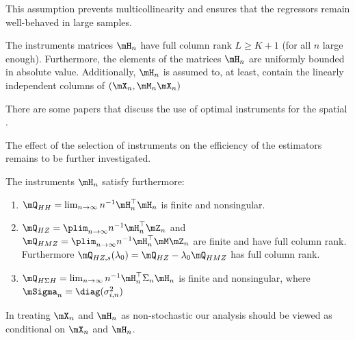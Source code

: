 \documentclass[english,12pt]{book}\usepackage[]{graphicx}\usepackage[]{xcolor}
\begin{document}
This assumption prevents multicollinearity and ensures that the regressors remain well-behaved in large samples.

\begin{assumption} The instruments matrices $\mH_n$ have full column rank $L \geq K + 1$ (for all $n$ large enough). Furthermore, the elements of the matrices $\mH_n$ are uniformly bounded in absolute value. Additionally, $\mH_n$ is assumed to, at least, contain the linearly independent columns of $(\mX_n, \mM_n\mX_n)$
\end{assumption}

There are some papers that discuss the use of optimal instruments for the spatial \citep[see for example][]{lee2003best, das2003finite, Keliejian2004, lee2007gmm}.

\begin{remark}
The effect of the selection of instruments on the efficiency of the estimators remains to be further investigated.
\end{remark}

\begin{assumption}\label{assumption:instruments-arraiz} 
The instruments $\mH_n$ satisfy furthermore:
\begin{enumerate}
\item $\mQ_{HH} = \lim_{n \to \infty}n^{-1}\mH_n^\top\mH_n$ is finite and nonsingular.
\item $\mQ_{HZ} = \plim_{n \to \infty}n^{-1}\mH_n^\top\mZ_n$ and $\mQ_{HMZ} = \plim_{n \to \infty}n^{-1}\mH_n^\top\mM\mZ_n$ are finite and have full column rank. Furthermore $\mQ_{HZ,s}(\lambda_0) = \mQ_{HZ}-\lambda_0\mQ_{HMZ}$ has full column rank.
\item $\mQ_{H\Sigma H} = \lim_{n \to \infty}n^{-1}\mH_n^\top\Sigma_n\mH_n$ is finite and nonsingular, where $\mSigma_n= \diag(\sigma^2_{i,n})$
\end{enumerate}
\end{assumption}

In treating $\mX_n$ and $\mH_n$ as non-stochastic our analysis should be viewed as conditional on $\mX_n$ and $\mH_n$.
\end{document}
